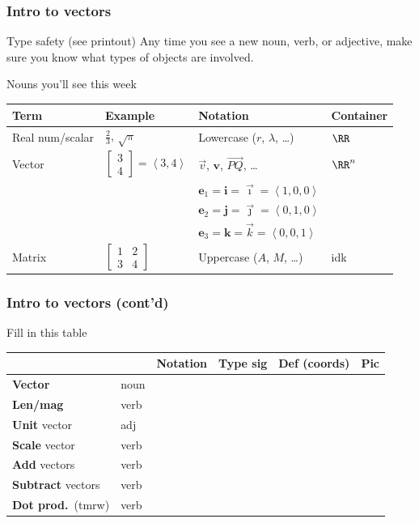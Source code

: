 \documentclass[11pt]{beamer}
\begin{document}
\begin{frame}
  \frametitle{Intro to vectors}
  \begin{alertblock}{Type safety (see printout)}
  Any time you see a new noun, verb, or adjective,
  make sure you know what \alert{types} of objects are involved.
  \end{alertblock}
  \begin{exampleblock}{Nouns you'll see this week}
    \begin{tabular}{llll}
      Term & Example & Notation & Container \\\hline
      Real num/scalar & $\frac23$, $\sqrt\pi$ & Lowercase ($r$, $\lambda$, \dots) & $\RR$ \\
      Vector & $\begin{bmatrix} 3 \\ 4 \end{bmatrix} = \left< 3,4 \right>$
             & $\vec v$, $\mathbf{v}$, $\overrightarrow{PQ}$, \dots & $\RR^n$ \\
             && $\mathbf{e}_1 = \mathbf{i} = \vec{\imath} = \left< 1,0,0 \right>$ \\
             && $\mathbf{e}_2 = \mathbf{j} = \vec{\jmath} = \left< 0,1,0 \right>$ \\
             && $\mathbf{e}_3 = \mathbf{k} = \vec{k} = \left< 0,0,1 \right>$ \\
      Matrix & $\begin{bmatrix} 1 & 2 \\ 3 & 4 \end{bmatrix}$ & Uppercase ($A$, $M$, \dots)
             & idk
    \end{tabular}
  \end{exampleblock}
\end{frame}

\begin{frame}
  \frametitle{Intro to vectors (cont'd)}
  \begin{block}{Fill in this table}
  \begin{tabular}{llllll}
    & & Notation & Type sig & Def (coords) & Pic \\ \hline
    \textbf{Vector} & noun \\
    \textbf{Len/mag} & verb \\
    \textbf{Unit} vector & adj \\
    \textbf{Scale} vector & verb \\
    \textbf{Add} vectors & verb \\
    \textbf{Subtract} vectors & verb \\
    \textbf{Dot prod.}\ (tmrw) & verb \\
  \end{tabular}
  \end{block}
\end{frame}
\end{document}
